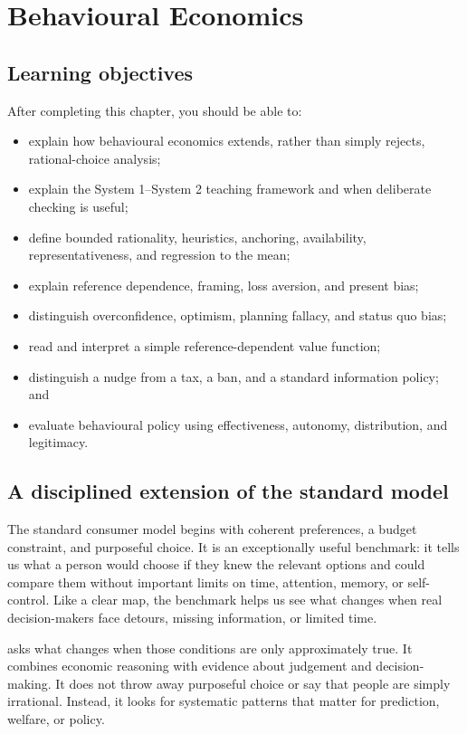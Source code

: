\chapter{Behavioural Economics}
\label{chap:behavioural}

\section{Learning objectives}

After completing this chapter, you should be able to:
\begin{itemize}
  \item explain how behavioural economics extends, rather than simply rejects, rational-choice analysis;
  \item explain the System 1--System 2 teaching framework and when deliberate checking is useful;
  \item define bounded rationality, heuristics, anchoring, availability, representativeness, and regression to the mean;
  \item explain reference dependence, framing, loss aversion, and present bias;
  \item distinguish overconfidence, optimism, planning fallacy, and status quo bias;
  \item read and interpret a simple reference-dependent value function;
  \item distinguish a nudge from a tax, a ban, and a standard information policy; and
  \item evaluate behavioural policy using effectiveness, autonomy, distribution, and legitimacy.
\end{itemize}

\section{A disciplined extension of the standard model}

The standard consumer model begins with coherent preferences, a budget
constraint, and purposeful choice. It is an exceptionally useful benchmark:
it tells us what a person would choose if they knew the relevant options and
could compare them without important limits on time, attention, memory, or
self-control. Like a clear map, the benchmark helps us see what changes when
real decision-makers face detours, missing information, or limited time.

 asks what changes when those conditions are
only approximately true. It combines economic reasoning with evidence about
judgement and decision-making. It does not throw away purposeful choice or
say that people are simply irrational. Instead, it looks for systematic
patterns that matter for prediction, welfare, or policy.

